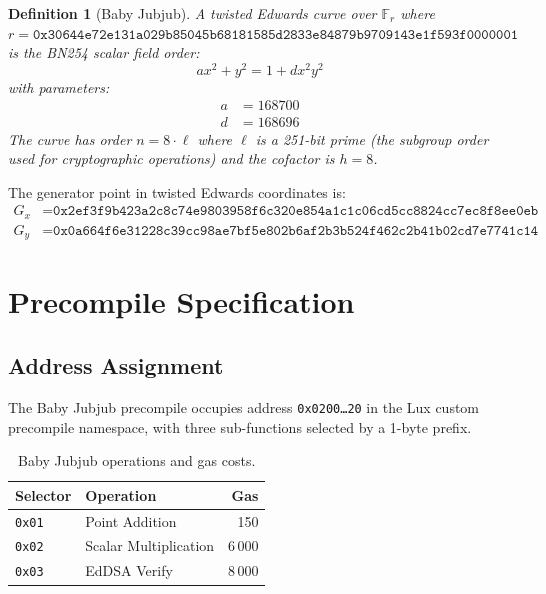\documentclass[11pt,a4paper]{article}
\newtheorem{definition}{Definition}
\begin{document}
\begin{definition}[Baby Jubjub]
A twisted Edwards curve over $\mathbb{F}_r$ where
$r = \texttt{0x30644e72e131a029b85045b68181585d2833e84879b9709143e1f593f0000001}$
is the BN254 scalar field order:
\begin{equation}
  a x^2 + y^2 = 1 + d x^2 y^2
\end{equation}
with parameters:
\begin{align}
  a &= 168700 \\
  d &= 168696
\end{align}
The curve has order $n = 8 \cdot \ell$ where $\ell$ is a 251-bit prime (the subgroup
order used for cryptographic operations) and the cofactor is $h = 8$.
\end{definition}

The generator point in twisted Edwards coordinates is:
\begin{align}
  G_x &= \texttt{0x2ef3f9b423a2c8c74e9803958f6c320e854a1c1c06cd5cc8824cc7ec8f8ee0eb} \\
  G_y &= \texttt{0x0a664f6e31228c39cc98ae7bf5e802b6af2b3b524f462c2b41b02cd7e7741c14}
\end{align}

\section{Precompile Specification}

\subsection{Address Assignment}

The Baby Jubjub precompile occupies address \texttt{0x0200\ldots20} in the Lux
custom precompile namespace, with three sub-functions selected by a 1-byte prefix.

\begin{table}[H]
\centering
\caption{Baby Jubjub operations and gas costs.}
\begin{tabular}{llr}
\toprule
\textbf{Selector} & \textbf{Operation} & \textbf{Gas} \\
\midrule
\texttt{0x01} & Point Addition & 150 \\
\texttt{0x02} & Scalar Multiplication & 6\,000 \\
\texttt{0x03} & EdDSA Verify & 8\,000 \\
\bottomrule
\end{tabular}
\end{table}
\end{document}
